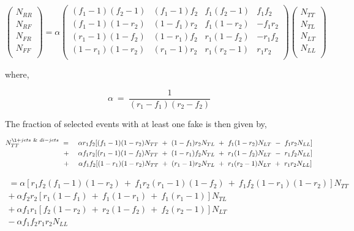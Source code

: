 \begin{equation}
   \begin{pmatrix}
      N_{RR} \\
      N_{RF} \\
      N_{FR} \\
      N_{FF} \\
   \end{pmatrix}
   = \alpha
   \begin{pmatrix}
      (f_{1}-1)(f_{2}-1) & (f_{1}-1)f_{2} & f_{1}(f_{2}-1) & f_{1}f_{2} \\
      (f_{1}-1)(1-r_{2}) & (1-f_{1})r_{2} & f_{1}(1-r_{2}) & -f_{1}r_{2} \\
      (r_{1}-1)(1-f_{2}) & (1-r_{1})f_{2} & r_{1}(1-f_{2}) & -r_{1}f_{2} \\
      (1-r_{1})(1-r_{2}) & (r_{1}-1)r_{2} & r_{1}(r_{2}-1) & r_{1}r_{2} \\
   \end{pmatrix}
   \begin{pmatrix}
      N_{TT} \\
      N_{TL} \\
      N_{LT} \\
      N_{LL} \\
   \end{pmatrix}
\end{equation}

where,

\begin{equation}
   \alpha~=~\frac{1}{(r_{1}-f_{1})(r_{2}-f_{2})}
\end{equation}

The fraction of selected events with at least one fake is then given by,

\begin{equation}
\begin{aligned}
   N^{\l+jets~\&~di-jets}_{TT}~&=&~\alpha r_{1}f_{2}[(f_{1}-1)(1-r_{2})N_{TT}~+~(1-f_{1})r_{2}N_{TL}~&+~f_{1}(1-r_{2})N_{LT}~-~f_{1}r_{2}N_{LL}] \\
      &~+&~\alpha f_{1}r_{2}[(r_{1}-1)(1-f_{2})N_{TT}~+~(1-r_{1})f_{2}N_{TL}~&+~r_{1}(1-f_{2})N_{LT}~-~r_{1}f_{2}N_{LL}] \\
      &~+&~\alpha f_{1}f_{2}[(1-r_{1})(1-r_{2})N_{TT}~+~(r_{1}-1)r_{2}N_{TL}~&+~r_{1}(r_{2}-1)N_{LT}~+~r_{1}r_{2}N_{LL}] 
\end{aligned}
\end{equation}

\begin{equation} \label{eq:mainFakeResult}
\begin{aligned}
   =\alpha[r_{1}f_{2}(f_{1}-1)(1-r_{2})~+~f_{1}r_{2}(r_{1}-1)(1-f_{2})~+~f_{1}f_{2}(1-r_{1})(1-r_{2})]N_{TT} \\
   +~\alpha f_{2}r_{2}[r_{1}(1-f_{1})~+~f_{1}(1-r_{1})~+~f_{1}(r_{1}-1)]N_{TL} \\
   +~\alpha f_{1}r_{1}[f_{2}(1-r_{2})~+~r_{2}(1-f_{2})~+~f_{2}(r_{2}-1)]N_{LT} \\
   -~\alpha f_{1}f_{2}r_{1}r_{2}N_{LL}
\end{aligned}
\end{equation}


